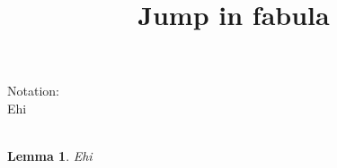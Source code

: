 \documentclass{article}
\title{Jump in fabula}
\author{}
\date{}
\theoremstyle{plain}
\newtheorem{lem}[teo]{Lemma}
\theoremstyle{definition}
\theoremstyle{remark}
\begin{document}
Notation:\\
Ehi\\
\\
\begin{lem}
Ehi
\end{lem}
\end{document}
